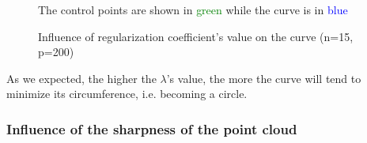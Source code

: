 \documentclass{article}
\begin{document}
\begin{figure}[H]
    \centering
    \caption[Influence of regularization coefficient's value on the curve]{Influence of regularization coefficient's value on the curve (n=15, p=200)} {The control points are shown in \textcolor{green}{green} while the curve is in \textcolor{blue}{blue}}
    \label{fig:bsp_res_lambda}
\end{figure}

As we expected, the higher the $\lambda$'s value, the more the curve will tend to minimize its circumference, i.e. becoming a circle. 

\subsubsection{Influence of the sharpness of the point cloud}
\end{document}
